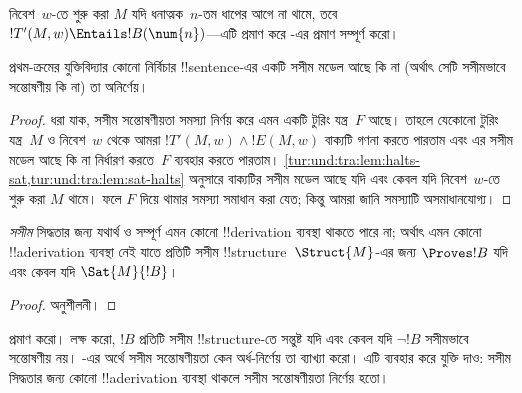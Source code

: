 \documentclass[../../../include/open-logic-section]{subfiles}
\begin{document}
\begin{prob}
  নিবেশ~$w$-তে শুরু করা $M$ যদি ধনাত্মক~$n$-তম ধাপের আগে না থামে, তবে
  $!T'(M,w)\Entails !B(\num{n})$—এটি প্রমাণ করে
  -এর প্রমাণ সম্পূর্ণ করো।
\end{prob}

\begin{thm}[ট্রাখতেনব্রোটের উপপাদ্য]
  প্রথম-ক্রমের যুক্তিবিদ্যার কোনো নির্বিচার !!{sentence}-এর একটি সসীম
  মডেল আছে কি না (অর্থাৎ সেটি সসীমভাবে সন্তোষণীয় কি না) তা অনির্ণেয়।
\end{thm}

\begin{proof}
  ধরা যাক, সসীম সন্তোষণীয়তা সমস্যা নির্ণয় করে এমন একটি টুরিং যন্ত্র~$F$
  আছে। তাহলে যেকোনো টুরিং যন্ত্র~$M$ ও নিবেশ~$w$ থেকে আমরা
  $!T'(M,w)\land !E(M,w)$ বাক্যটি গণনা করতে পারতাম এবং এর সসীম মডেল
  আছে কি না নির্ধারণ করতে~$F$ ব্যবহার করতে পারতাম।
  \cref{tur:und:tra:lem:halts-sat,tur:und:tra:lem:sat-halts} অনুসারে
  বাক্যটির সসীম মডেল আছে যদি এবং কেবল যদি নিবেশ~$w$-তে শুরু করা $M$
  থামে। ফলে $F$ দিয়ে থামার সমস্যা সমাধান করা যেত; কিন্তু আমরা জানি
  সমস্যাটি অসমাধানযোগ্য।
\end{proof}

\begin{cor}%
  \emph{সসীম} সিদ্ধতার জন্য যথার্থ ও সম্পূর্ণ এমন কোনো !!{derivation}
  ব্যবস্থা থাকতে পারে না; অর্থাৎ এমন কোনো !!a{derivation} ব্যবস্থা নেই
  যাতে প্রতিটি সসীম !!{structure}~$\Struct{M}$-এর জন্য
  $\Proves !B$ যদি এবং কেবল যদি $\Sat{M}{!B}$।
\end{cor}

\begin{proof}
  অনুশীলনী।
\end{proof}

\begin{prob}
   প্রমাণ করো। লক্ষ করো,
  $!B$ প্রতিটি সসীম !!{structure}-তে সন্তুষ্ট যদি এবং কেবল যদি
  $\lnot !B$ সসীমভাবে সন্তোষণীয় নয়।
  -এর অর্থে সসীম সন্তোষণীয়তা কেন
  অর্ধ-নির্ণেয় তা ব্যাখ্যা করো। এটি ব্যবহার করে যুক্তি দাও: সসীম
  সিদ্ধতার জন্য কোনো !!a{derivation} ব্যবস্থা থাকলে সসীম সন্তোষণীয়তা
  নির্ণেয় হতো।
\end{prob}
\end{document}
